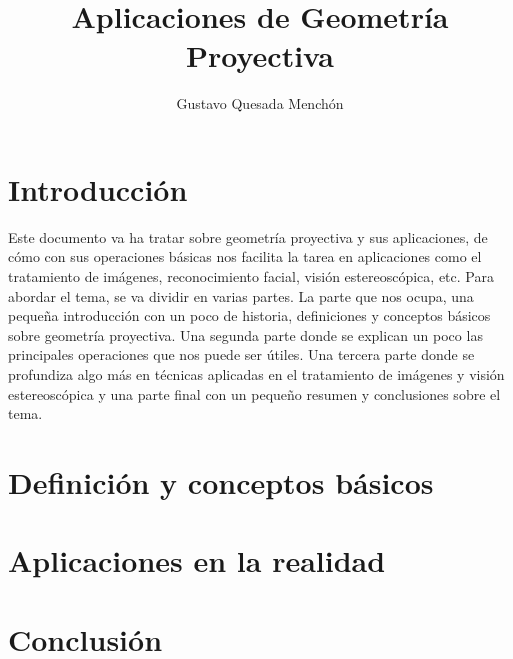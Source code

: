 \documentclass[a4,10pt]{article}
\begin{document}
\title{Aplicaciones de Geometría Proyectiva}
\author{Gustavo Quesada Menchón}
\date{}
\maketitle
\newpage

\tableofcontents

\section{Introducción}

Este documento va ha tratar sobre geometría proyectiva y sus aplicaciones, de cómo con sus operaciones básicas nos facilita la tarea en aplicaciones como el tratamiento de imágenes, reconocimiento facial, visión estereoscópica, etc. Para abordar el tema, se va dividir en varias partes. La parte que nos ocupa, una pequeña introducción con un poco de historia, definiciones y conceptos básicos sobre geometría proyectiva. Una segunda parte donde se explican un poco las principales operaciones que nos puede ser útiles. Una tercera parte donde se profundiza algo más en técnicas aplicadas en el tratamiento de imágenes y visión estereoscópica y una parte final con un pequeño resumen y conclusiones sobre el tema.


\section {Definición y conceptos básicos}




\section{Aplicaciones en la realidad}




\section{Conclusión}




\end{document}
